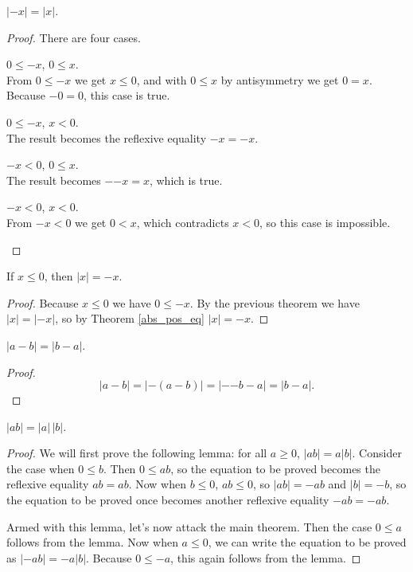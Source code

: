 \documentclass[../../math.tex]{subfiles}
\begin{document}
\begin{theorem}
    $|{-x}| = |x|$.
\end{theorem}
\begin{proof}
    There are four cases.
    \begin{case} $0 \leq -x$, $0 \leq x$. \\
        From $0 \leq -x$ we get $x \leq 0$, and with $0 \leq x$ by antisymmetry
        we get $0 = x$.  Because $-0 = 0$, this case is true.
    \end{case}
    \begin{case} $0 \leq -x$, $x < 0$. \\
        The result becomes the reflexive equality $-x = -x$.
    \end{case}
    \begin{case} $-x < 0$, $0 \leq x$. \\
        The result becomes $-{-x} = x$, which is true.
    \end{case}
    \begin{case} $-x < 0$, $x < 0$. \\
        From $-x < 0$ we get $0 < x$, which contradicts $x < 0$, so this case is
        impossible.
    \end{case}
\end{proof}

\begin{theorem}
    If $x \leq 0$, then $|x| = -x$.
\end{theorem}
\begin{proof}
    Because $x \leq 0$ we have $0 \leq -x$.  By the previous theorem we have
    $|x| = |{-x}|$, so by Theorem \ref{abs_pos_eq} $|x| = -x$.
\end{proof}

\begin{theorem}
    $|a - b| = |b - a|$.
\end{theorem}
\begin{proof}
    \[
        |a - b| = |{-(a - b)}| = |{-{-b}} - a| = |b - a|.
    \]
\end{proof}

\begin{theorem}
    $|ab| = |a|\,|b|$.
\end{theorem}
\begin{proof}
    We will first prove the following lemma: for all $a \geq 0$, $|ab| = a|b|$.
    Consider the case when $0 \leq b$.  Then $0 \leq ab$, so the equation to be
    proved becomes the reflexive equality $ab = ab$.  Now when $b \leq 0$, $ab
    \leq 0$, so $|ab| = -ab$ and $|b| = -b$, so the equation to be proved once
    becomes another reflexive equality $-ab = -ab$.

    Armed with this lemma, let's now attack the main theorem.  Then the case $0
    \leq a$ follows from the lemma.  Now when $a \leq 0$, we can write the
    equation to be proved as $|-ab| = -a|b|$.  Because $0 \leq -a$, this again
    follows from the lemma.
\end{proof}
\end{document}
